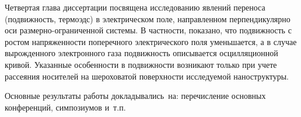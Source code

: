Четвертая глава диссертации посвящена исследованию явлений переноса (подвижность, термоэдс) в электрическом поле, направленном перпендикулярно оси размерно-ограниченной системы. В частности, показано, что подвижность с ростом напряженности поперечного электрического поля уменьшается, а в случае вырожденного электронного газа подвижность описывается осцилляционной кривой. Указанные особенности в подвижности возникают только при учете рассеяния носителей на шероховатой поверхности исследуемой наноструктуры.

%
%
%
%
%
%
%
%


{\probation}
Основные результаты работы докладывались~на:
перечисление основных конференций, симпозиумов и~т.\:п.

